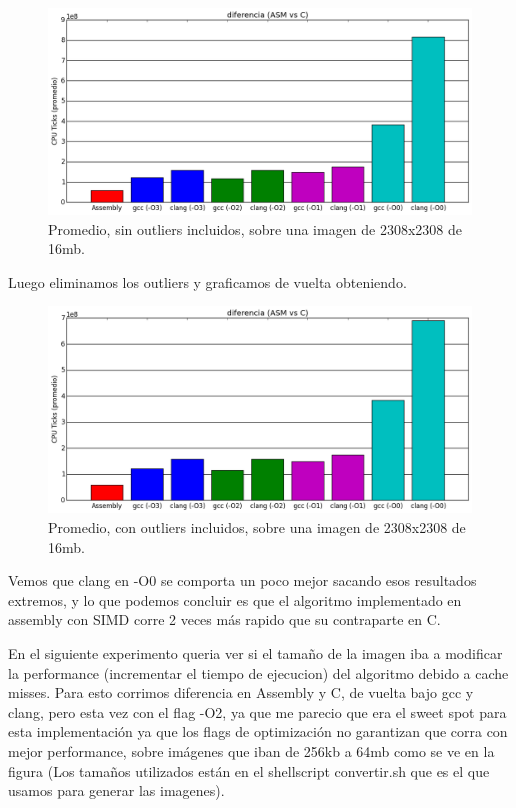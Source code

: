 \documentclass[a4paper]{article}
\begin{document}
\begin{figure}[h]
\includegraphics[scale=0.56]{imagenes/test_difrencia_ASM_C_promedio.png}
\caption{Promedio, sin outliers incluidos, sobre una imagen de 2308x2308 de 16mb.}
\end{figure}

\noindent Luego eliminamos los outliers y graficamos de vuelta obteniendo.\\


\begin{figure}[h]
\includegraphics[scale=0.56]{imagenes/test_difrencia_ASM_C_no_outliers.png}
\caption{Promedio, con outliers incluidos, sobre una imagen de 2308x2308 de 16mb.}
\end{figure}

\noindent Vemos que clang en -O0 se comporta un poco mejor sacando esos resultados extremos, y lo que podemos concluir es que el algoritmo implementado en assembly con SIMD corre 2 veces más rapido que su contraparte en C.

\newpage 

\noindent En el siguiente experimento queria ver si el tamaño de la imagen iba a modificar la performance (incrementar el tiempo de ejecucion) del algoritmo debido a cache misses. Para esto corrimos diferencia en Assembly y C, de vuelta bajo gcc y clang, pero esta vez con el flag -O2, ya que me parecio que era el sweet spot para esta implementación ya que los flags de optimización no garantizan que corra con mejor performance, sobre imágenes que iban de 256kb a 64mb como se ve en la figura (Los tamaños utilizados están en el shellscript convertir.sh que es el que usamos para generar las imagenes). 
\end{document}
